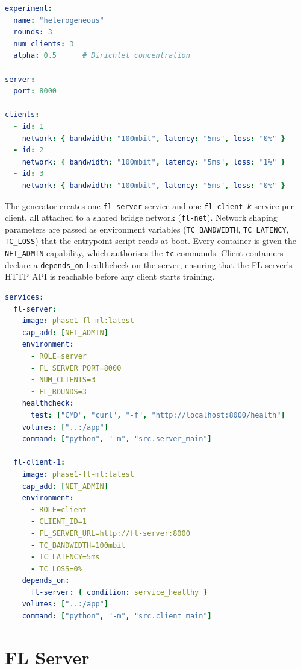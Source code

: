 \documentclass[12pt,a4paper]{report}
\begin{document}
\begin{lstlisting}[language=yaml, caption={Experiment configuration
  (\texttt{heterogeneous.yaml}).}, label=lst:yaml]
experiment:
  name: "heterogeneous"
  rounds: 3
  num_clients: 3
  alpha: 0.5      # Dirichlet concentration

server:
  port: 8000

clients:
  - id: 1
    network: { bandwidth: "100mbit", latency: "5ms", loss: "0%" }
  - id: 2
    network: { bandwidth: "100mbit", latency: "5ms", loss: "1%" }
  - id: 3
    network: { bandwidth: "100mbit", latency: "5ms", loss: "0%" }
\end{lstlisting}

The generator creates one \texttt{fl-server} service and one
\texttt{fl-client-\textit{k}} service per client, all attached to a
shared bridge network (\texttt{fl-net}).  Network shaping parameters are
passed as environment variables (\texttt{TC\_BANDWIDTH},
\texttt{TC\_LATENCY}, \texttt{TC\_LOSS}) that the entrypoint script
reads at boot.  Every container is given the \texttt{NET\_ADMIN}
capability, which authorises the \texttt{tc} commands.  Client containers
declare a \texttt{depends\_on} healthcheck on the server, ensuring that
the FL server's HTTP API is reachable before any client starts training.

\begin{lstlisting}[language=yaml, caption={Excerpt from a generated
  \texttt{compose.generated.yml}.}, label=lst:compose]
services:
  fl-server:
    image: phase1-fl-ml:latest
    cap_add: [NET_ADMIN]
    environment:
      - ROLE=server
      - FL_SERVER_PORT=8000
      - NUM_CLIENTS=3
      - FL_ROUNDS=3
    healthcheck:
      test: ["CMD", "curl", "-f", "http://localhost:8000/health"]
    volumes: ["..:/app"]
    command: ["python", "-m", "src.server_main"]

  fl-client-1:
    image: phase1-fl-ml:latest
    cap_add: [NET_ADMIN]
    environment:
      - ROLE=client
      - CLIENT_ID=1
      - FL_SERVER_URL=http://fl-server:8000
      - TC_BANDWIDTH=100mbit
      - TC_LATENCY=5ms
      - TC_LOSS=0%
    depends_on:
      fl-server: { condition: service_healthy }
    volumes: ["..:/app"]
    command: ["python", "-m", "src.client_main"]
\end{lstlisting}

\section{FL Server}
\end{document}

